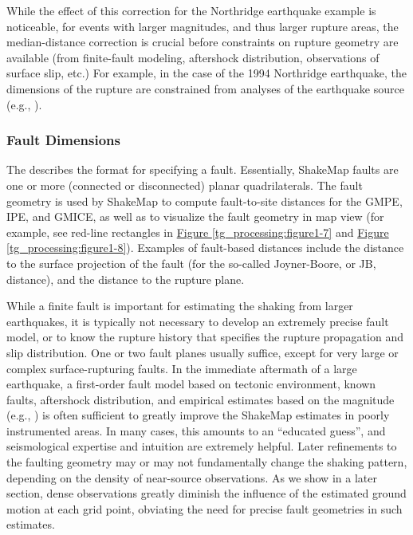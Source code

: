 \documentclass[letterpaper,10pt,english]{sphinxmanual}
\begin{document}
While the effect of this correction for the Northridge earthquake example is noticeable,
for events with larger magnitudes, and thus larger rupture areas, the median-distance
correction is crucial before
constraints on rupture geometry are available (from finite-fault modeling, aftershock
distribution, observations of surface slip, etc.) For example, in the case of the 1994
Northridge earthquake, the dimensions of the rupture are constrained from analyses of
the earthquake source (e.g., {\hyperref[references:wald1996]{}}).


\subsubsection{Fault Dimensions}
\label{tg_processing:sec-fault-dimensions}\label{tg_processing:fault-dimensions}
The {\hyperref[software_guide:sm35\string-software\string-guide]{}} describes the format for specifying a
fault. Essentially, ShakeMap
faults are one or more (connected or disconnected) planar quadrilaterals. The fault
geometry is used by ShakeMap to compute fault-to-site distances for the GMPE, IPE, and
GMICE, as well as to visualize the fault geometry in map view (for example, see red-line
rectangles in \hyperref[tg_processing:figure1-7]{Figure  \ref*{tg_processing:figure1-7}} and \hyperref[tg_processing:figure1-8]{Figure  \ref*{tg_processing:figure1-8}}). Examples of
fault-based distances include the distance to the surface projection of the
fault (for the so-called Joyner-Boore, or JB, distance), and the distance to the rupture plane.

While a finite fault is important for estimating the shaking from larger earthquakes, it is
typically not necessary to develop an extremely precise fault model, or to know the
rupture history that specifies the rupture propagation and slip distribution.
One or two fault planes usually suffice, except for very large or complex
surface-rupturing faults. In the immediate aftermath of a large earthquake, a first-order
fault model based on tectonic environment, known faults, aftershock distribution, and
empirical estimates based on the magnitude (e.g., {\hyperref[references:wells1994]{}}) is often
sufficient to greatly improve the ShakeMap estimates in poorly instrumented areas. In
many cases, this amounts to an ``educated guess”, and seismological expertise and
intuition are extremely helpful. Later refinements to the faulting geometry may or may
not fundamentally change the shaking pattern, depending on the density of near-source
observations. As we show in a later section, dense observations greatly diminish the
influence of the estimated ground motion at each grid point, obviating the need for precise
fault geometries in such estimates.
\end{document}
